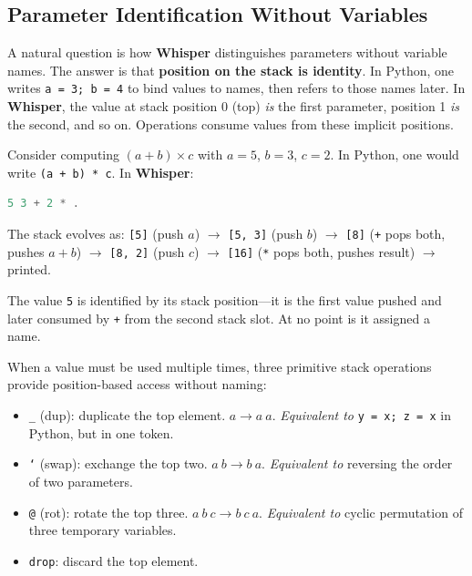 \documentclass[11pt,a4paper]{article}
\begin{document}
\subsection{Parameter Identification Without Variables}

A natural question is how \textbf{Whisper} distinguishes parameters without
variable names. The answer is that \textbf{position on the stack is identity}.
In Python, one writes \texttt{a = 3; b = 4} to bind values to names, then
refers to those names later. In \textbf{Whisper}, the value at stack position
0 (top) \textit{is} the first parameter, position 1 \textit{is} the second,
and so on. Operations consume values from these implicit positions.

Consider computing $(a + b) \times c$ with $a = 5$, $b = 3$, $c = 2$.
In Python, one would write \texttt{(a + b) * c}. In \textbf{Whisper}:

\begin{lstlisting}[language=C,basicstyle=\ttfamily\small]
5 3 + 2 * .
\end{lstlisting}

The stack evolves as:
\texttt{[5]} (push $a$) $\rightarrow$
\texttt{[5, 3]} (push $b$) $\rightarrow$
\texttt{[8]} (\texttt{+} pops both, pushes $a+b$) $\rightarrow$
\texttt{[8, 2]} (push $c$) $\rightarrow$
\texttt{[16]} (\texttt{*} pops both, pushes result) $\rightarrow$ printed.

The value \texttt{5} is identified by its stack position---it is the first
value pushed and later consumed by \texttt{+} from the second stack slot.
At no point is it assigned a name.

When a value must be used multiple times, three primitive stack operations
provide position-based access without naming:

\begin{itemize}
\item \texttt{\_} (dup): duplicate the top element. $a \rightarrow a\ a$.
  \textit{Equivalent to} \texttt{y = x; z = x} in Python, but in one token.
\item \texttt{`} (swap): exchange the top two. $a\ b \rightarrow b\ a$.
  \textit{Equivalent to} reversing the order of two parameters.
\item \texttt{@} (rot): rotate the top three. $a\ b\ c \rightarrow b\ c\ a$.
  \textit{Equivalent to} cyclic permutation of three temporary variables.
\item \texttt{drop}: discard the top element.
\end{itemize}
\end{document}
